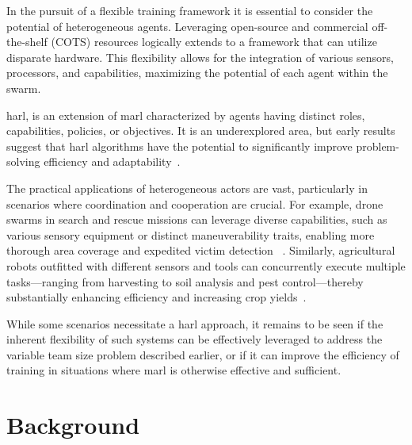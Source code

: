 In the pursuit of a flexible training framework
it is essential to consider the potential of heterogeneous agents. 
Leveraging open-source and commercial off-the-shelf (COTS) resources 
logically extends to a framework that can utilize disparate hardware. 
This flexibility allows for the integration of various sensors, processors, 
and capabilities, maximizing the potential of each agent within the swarm. 

\Gls{harl}, is an extension of \gls{marl} characterized by agents having 
distinct roles, capabilities, policies, or objectives. It is an 
underexplored area, but early results suggest that \gls{harl} algorithms
have the potential to significantly improve problem-solving efficiency 
and adaptability~\cite{calvo2018}.

The practical applications of heterogeneous actors are vast, particularly in 
scenarios where coordination and cooperation are crucial. For example, 
drone swarms in search and rescue missions can leverage diverse capabilities, 
such as various sensory equipment or distinct maneuverability traits, 
enabling more thorough area coverage and expedited victim detection
~\cite{hoang2023,kouzeghar2023}.
Similarly, agricultural robots outfitted with different sensors and tools can 
concurrently execute multiple tasks—ranging from harvesting to soil analysis and
pest control—thereby substantially enhancing efficiency and increasing crop 
yields~\cite{carbone2018,amarasinghe2019}.

While some scenarios necessitate a \gls{harl} approach, it remains to 
be seen if the inherent flexibility of such systems can be effectively 
leveraged to address the variable team size problem described earlier, 
or if it can improve the efficiency of training in situations where 
\gls{marl} is otherwise effective and sufficient.


\section{Background}%
\label{sec:background}

